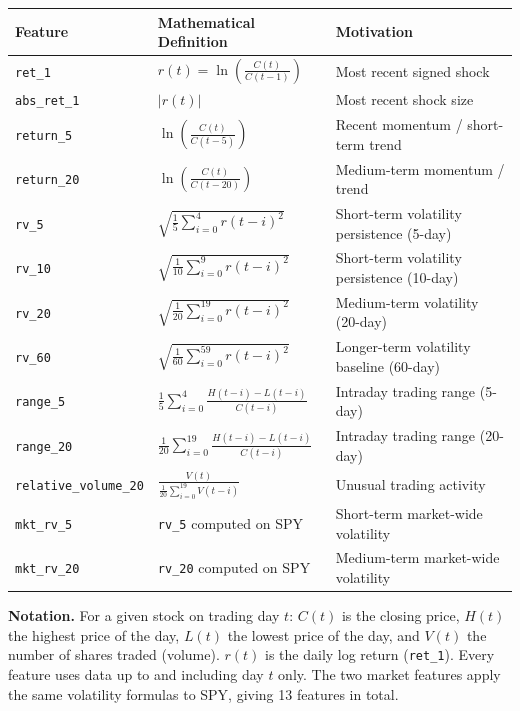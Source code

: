 \documentclass[11pt]{article}
\newcommand{\code}[1]{\texttt{#1}}
\begin{document}
\begin{center}
{\small
\begin{tabular}{lll}
\hline
\textbf{Feature} & \textbf{Mathematical Definition} & \textbf{Motivation} \\
\hline
\code{ret\_1} & $r(t) = \ln\left(\frac{C(t)}{C(t-1)}\right)$ & Most recent signed shock \\[4pt]
\code{abs\_ret\_1} & $\lvert r(t) \rvert$ & Most recent shock size \\[4pt]
\code{return\_5} & $\ln\left(\frac{C(t)}{C(t-5)}\right)$ & Recent momentum / short-term trend \\[4pt]
\code{return\_20} & $\ln\left(\frac{C(t)}{C(t-20)}\right)$ & Medium-term momentum / trend \\[4pt]
\code{rv\_5} & $\sqrt{\frac{1}{5}\sum_{i=0}^{4} r(t-i)^2}$ & Short-term volatility persistence (5-day) \\[4pt]
\code{rv\_10} & $\sqrt{\frac{1}{10}\sum_{i=0}^{9} r(t-i)^2}$ & Short-term volatility persistence (10-day) \\[4pt]
\code{rv\_20} & $\sqrt{\frac{1}{20}\sum_{i=0}^{19} r(t-i)^2}$ & Medium-term volatility (20-day) \\[4pt]
\code{rv\_60} & $\sqrt{\frac{1}{60}\sum_{i=0}^{59} r(t-i)^2}$ & Longer-term volatility baseline (60-day) \\[4pt]
\code{range\_5} & $\frac{1}{5}\sum_{i=0}^{4} \frac{H(t-i) - L(t-i)}{C(t-i)}$ & Intraday trading range (5-day) \\[4pt]
\code{range\_20} & $\frac{1}{20}\sum_{i=0}^{19} \frac{H(t-i) - L(t-i)}{C(t-i)}$ & Intraday trading range (20-day) \\[4pt]
\code{relative\_volume\_20} & $\frac{V(t)}{\frac{1}{20}\sum_{i=0}^{19} V(t-i)}$ & Unusual trading activity \\[4pt]
\code{mkt\_rv\_5} & \code{rv\_5} computed on SPY & Short-term market-wide volatility \\
\code{mkt\_rv\_20} & \code{rv\_20} computed on SPY & Medium-term market-wide volatility \\
\hline
\end{tabular}
}
\end{center}

\textbf{Notation.} For a given stock on trading day $t$: $C(t)$ is the closing price, $H(t)$ the highest price of the day, $L(t)$ the lowest price of the day, and $V(t)$ the number of shares traded (volume). $r(t)$ is the daily log return (\code{ret\_1}). Every feature uses data up to and including day $t$ only. The two market features apply the same volatility formulas to SPY, giving 13 features in total.
\end{document}
